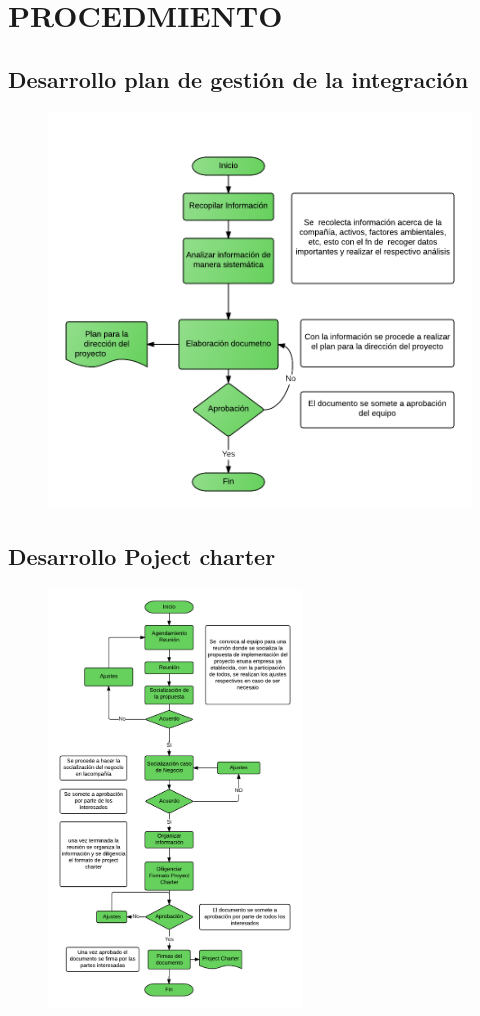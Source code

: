 \chapter{PROCEDMIENTO}
%
\section{Desarrollo plan de gesti\'on de la integraci\'on}
%
\begin{figure}[H]
    \centering
    \includegraphics[width=1\textwidth]{images/plangestion.png}
\end{figure}
%
\section{Desarrollo Poject charter}
%
\begin{figure}[H]
    \centering
    \includegraphics[width=0.6\textwidth]{images/projectcharter.png}
\end{figure}